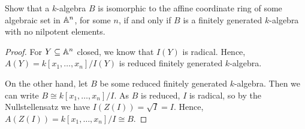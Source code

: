 \label{1.1.5}

Show that a $k$-algebra $B$ is isomorphic to the affine coordinate ring of some algebraic set in $\mathbb A^n$, for some $n$, if and only if $B$ is a finitely generated $k$-algebra with no nilpotent elements.

\begin{proof}
    For $Y \subseteq \mathbb A^n$ closed, we know that $I(Y)$ is radical. Hence, $A(Y) = k[x_1, \dots, x_n]/I(Y)$ is reduced finitely generated $k$-algebra.
    
    On the other hand, let $B$ be some reduced finitely generated $k$-algebra. Then we can write $B \cong k[x_1, \dots, x_n]/I$. As $B$ is reduced, $I$ is radical, so by the Nullstellensatz we have $I(Z(I)) = \sqrt{I} = I$. Hence, $A(Z(I)) = k[x_1, \dots, x_n]/I \cong B$.
\end{proof}